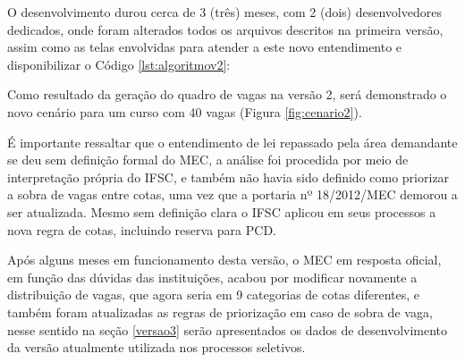 \newpage
O desenvolvimento durou cerca de 3 (três) meses, com 2 (dois) desenvolvedores dedicados, onde foram alterados todos os arquivos descritos na primeira versão, assim como as telas envolvidas para atender a este novo entendimento e disponibilizar o Código \ref{lst:algoritmov2}:




Como resultado da geração do quadro de vagas na versão 2, será demonstrado o novo cenário para um curso com 40 vagas (Figura \ref{fig:cenario2}).



É importante ressaltar que o entendimento de lei repassado pela área demandante se deu sem definição formal do \gls{MEC}, a análise foi procedida por meio de interpretação própria do \gls{IFSC}, e também não havia sido definido como priorizar a sobra de vagas entre cotas, uma vez que a portaria nº 18/2012/MEC  demorou a ser atualizada. Mesmo sem definição clara o \gls{IFSC} aplicou em seus processos a nova regra de cotas, incluindo reserva para \gls{PCD}.

Após alguns meses em funcionamento desta versão, o \gls{MEC} em resposta oficial, em função das dúvidas das instituições, acabou por modificar novamente a distribuição de vagas, que agora seria em 9 categorias de cotas diferentes, e também foram atualizadas as regras de priorização em caso de sobra de vaga, nesse sentido na seção \ref{versao3} serão apresentados os dados de desenvolvimento da versão atualmente utilizada nos processos seletivos.